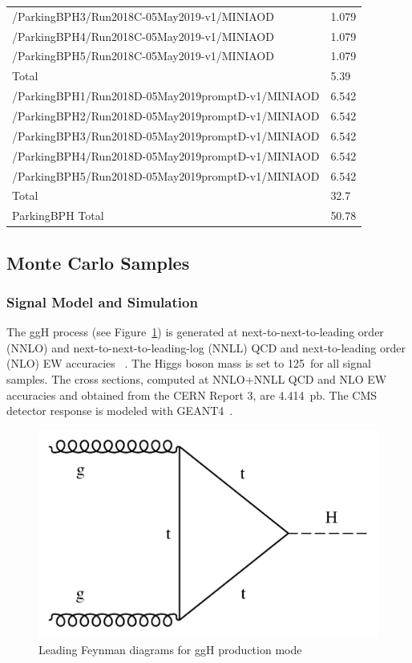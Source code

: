 \begin{table}[htb!]
\begin{center}
\begin{tabular}{l|l}
      /ParkingBPH3/Run2018C-05May2019-v1/MINIAOD  & 1.079 \\
      /ParkingBPH4/Run2018C-05May2019-v1/MINIAOD  & 1.079 \\
      /ParkingBPH5/Run2018C-05May2019-v1/MINIAOD  & 1.079 \\
      Total & 5.39\\
      \hline
      /ParkingBPH1/Run2018D-05May2019promptD-v1/MINIAOD  & 6.542 \\
      /ParkingBPH2/Run2018D-05May2019promptD-v1/MINIAOD  & 6.542 \\
      /ParkingBPH3/Run2018D-05May2019promptD-v1/MINIAOD  & 6.542 \\
      /ParkingBPH4/Run2018D-05May2019promptD-v1/MINIAOD  & 6.542 \\
      /ParkingBPH5/Run2018D-05May2019promptD-v1/MINIAOD  & 6.542 \\
      Total & 32.7\\
      \hline
      ParkingBPH Total & 50.78 \\
      \hline
    \end{tabular}
    \label{tab:datasample2018BPH}
  \end{center}
\end{table}




\subsection{Monte Carlo Samples}

\subsubsection{Signal Model and Simulation}

The ggH process (see Figure~\ref{fig:feynmanggH}) is generated at next-to-next-to-leading order (NNLO) and next-to-next-to-leading-log (NNLL) QCD and next-to-leading order (NLO) EW accuracies ~\cite{Heinemeyer:2013xd}.
The Higgs boson mass is set to 125~\GeV for all signal samples.
The cross sections, computed at NNLO+NNLL QCD and NLO EW accuracies and obtained from the
CERN Report 3,
are 4.414~$\mathrm{pb}$. The CMS detector response is modeled with GEANT4~\cite{Agostinelli:2002hh}.

\begin{figure}[h!]
  \caption{Leading Feynman diagrams for ggH production mode}
  \label{fig:feynmanggH}
  \centering
  \includegraphics[width=0.47\linewidth]{figs/feynmanggH.pdf}

\end{figure}



